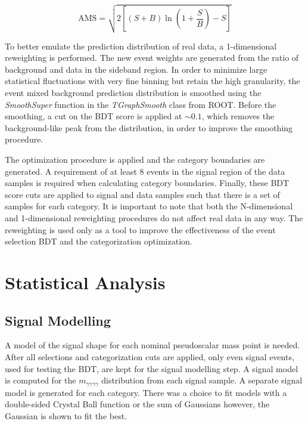 \documentclass[12pt]{article}
\begin{document}
\begin{equation} \label{eqn:ams}
\text{AMS} = \sqrt{2 \left[ (S + B) \ln \left(1 + \frac{S}{B}\right) - S \right]}
\end{equation}

To better emulate the prediction distribution of real data, a 1-dimensional reweighting is performed. The new event weights are generated from the ratio of background and data in the sideband region. In order to minimize large statistical fluctuations with very fine binning but retain the high granularity, the event mixed background prediction distribution is smoothed using the \textit{SmoothSuper} function in the \textit{TGraphSmooth} class from ROOT. Before the smoothing, a cut on the BDT score is applied at $\sim 0.1$, which removes the background-like peak from the distribution, in order to improve the smoothing procedure.\par

The optimization procedure is applied and the category boundaries are generated. A requirement of at least 8 events in the signal region of the data samples is required when calculating category boundaries.
Finally, these BDT score cuts are applied to signal and data samples such that there is a set of samples for each category. It is important to note that both the N-dimensional and 1-dimensional reweighting procedures do not affect real data in any way. The reweighting is used only as a tool to improve the effectiveness of the event selection BDT and the categorization optimization.\par


\section{Statistical Analysis}
\subsection{Signal Modelling} \label{sec:sig-mod}
A model of the signal shape for each nominal pseudoscalar mass point is needed. After all selections and categorization cuts are applied, only even signal events, used for testing the BDT, are kept for the signal modelling step. A signal model is computed for the $m_{\gamma \gamma \gamma \gamma}$ distribution from each signal sample. A separate signal model is generated for each category. There was a choice to fit models with a double-sided Crystal Ball function or the sum of Gaussians however, the Gaussian is shown to fit the best.\par
\end{document}
